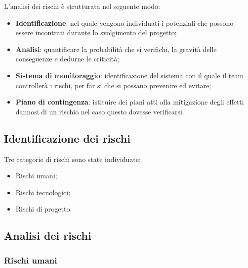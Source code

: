 
\newlength\colB \setlength\colB{6em}
\newlength\colC \setlength\colC{4em}
\newlength\colD \setlength\colD{16em}
\newlength\combinedlength
\setlength\combinedlength{%
    \dimexpr\colB+\colC+\colD+4\tabcolsep+%
    2\arrayrulewidth\relax}

L'analisi dei rischi è strutturata nel seguente modo:
\begin{itemize}
	\item \textbf{Identificazione}: nel quale vengono individuati i potenziali  che possono essere incontrati durante lo svolgimento del progetto;
	\item \textbf{Analisi}: quantificare la probabilità che si verifichi,
	la gravità delle conseguenze e dedurne le criticità;
	\item \textbf{Sistema di monitoraggio}: identificazione del sistema con il quale il team controllerà i rischi, per far si che si possano prevenire ed evitare;
	\item \textbf{Piano di contingenza}: istituire dei piani atti alla mitigazione degli effetti dannosi di un rischio nel caso questo dovesse verificarsi.
\end{itemize}
\subsection{Identificazione dei rischi}
	Tre categorie di rischi sono state individuate:
	\begin{itemize}
		\item Rischi umani;
		\item Rischi tecnologici;
		\item Rischi di progetto.
	\end{itemize}
\subsection{Analisi dei rischi}
	\subsubsection{Rischi umani}

